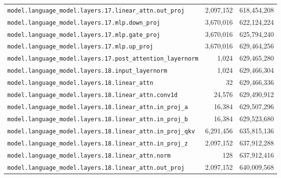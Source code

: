 \documentclass[10pt,a4paper]{article}
\theoremstyle{definition}
\begin{document}
\begin{appendices}
\begin{longtable}{p{9.5cm}rr}
\texttt{model.\allowbreak{}language\_model.\allowbreak{}layers.\allowbreak{}17.\allowbreak{}linear\_attn.\allowbreak{}out\_proj} & 2,097,152 & 618,454,208 \\
\texttt{model.\allowbreak{}language\_model.\allowbreak{}layers.\allowbreak{}17.\allowbreak{}mlp.\allowbreak{}down\_proj} & 3,670,016 & 622,124,224 \\
\texttt{model.\allowbreak{}language\_model.\allowbreak{}layers.\allowbreak{}17.\allowbreak{}mlp.\allowbreak{}gate\_proj} & 3,670,016 & 625,794,240 \\
\texttt{model.\allowbreak{}language\_model.\allowbreak{}layers.\allowbreak{}17.\allowbreak{}mlp.\allowbreak{}up\_proj} & 3,670,016 & 629,464,256 \\
\texttt{model.\allowbreak{}language\_model.\allowbreak{}layers.\allowbreak{}17.\allowbreak{}post\_attention\_layernorm} & 1,024 & 629,465,280 \\
\texttt{model.\allowbreak{}language\_model.\allowbreak{}layers.\allowbreak{}18.\allowbreak{}input\_layernorm} & 1,024 & 629,466,304 \\
\texttt{model.\allowbreak{}language\_model.\allowbreak{}layers.\allowbreak{}18.\allowbreak{}linear\_attn} & 32 & 629,466,336 \\
\texttt{model.\allowbreak{}language\_model.\allowbreak{}layers.\allowbreak{}18.\allowbreak{}linear\_attn.\allowbreak{}conv1d} & 24,576 & 629,490,912 \\
\texttt{model.\allowbreak{}language\_model.\allowbreak{}layers.\allowbreak{}18.\allowbreak{}linear\_attn.\allowbreak{}in\_proj\_a} & 16,384 & 629,507,296 \\
\texttt{model.\allowbreak{}language\_model.\allowbreak{}layers.\allowbreak{}18.\allowbreak{}linear\_attn.\allowbreak{}in\_proj\_b} & 16,384 & 629,523,680 \\
\texttt{model.\allowbreak{}language\_model.\allowbreak{}layers.\allowbreak{}18.\allowbreak{}linear\_attn.\allowbreak{}in\_proj\_qkv} & 6,291,456 & 635,815,136 \\
\texttt{model.\allowbreak{}language\_model.\allowbreak{}layers.\allowbreak{}18.\allowbreak{}linear\_attn.\allowbreak{}in\_proj\_z} & 2,097,152 & 637,912,288 \\
\texttt{model.\allowbreak{}language\_model.\allowbreak{}layers.\allowbreak{}18.\allowbreak{}linear\_attn.\allowbreak{}norm} & 128 & 637,912,416 \\
\texttt{model.\allowbreak{}language\_model.\allowbreak{}layers.\allowbreak{}18.\allowbreak{}linear\_attn.\allowbreak{}out\_proj} & 2,097,152 & 640,009,568 \\

\end{longtable}
\end{appendices}
\end{document}
